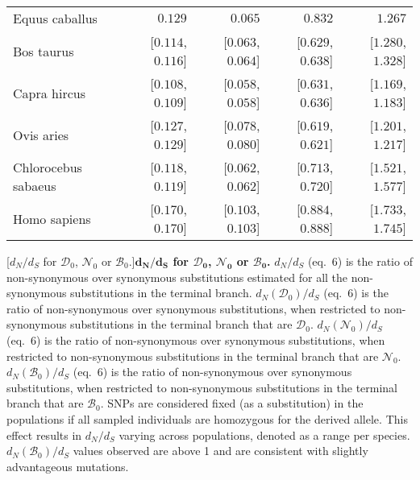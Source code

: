 \documentclass{article}
\newcommand{\dn}{d_N}
\newcommand{\ds}{d_S}
\newcommand{\dnds}{\dn / \ds}
\newcommand{\SphyDel}{\mathcal{D}_0}
\newcommand{\SphyNeu}{\mathcal{N}_0}
\newcommand{\SphyBen}{\mathcal{B}_0}
\begin{document}
\begin{center}
\begin{longtable*}{|l|r|r|r|r|}
            \bottomrule
            \endlastfoot
             Equus caballus & $ 0.129$ & $ 0.065$ & $ 0.832$ & $ 1.267$ \\
            Bos taurus & [$ 0.114$, $ 0.116$] & [$ 0.063$, $ 0.064$] & [$ 0.629$, $ 0.638$] & [$ 1.280$, $ 1.328$] \\
             Capra hircus & [$ 0.108$, $ 0.109$] & [$ 0.058$, $ 0.058$] & [$ 0.631$, $ 0.636$] & [$ 1.169$, $ 1.183$] \\
            Ovis aries & [$ 0.127$, $ 0.129$] & [$ 0.078$, $ 0.080$] & [$ 0.619$, $ 0.621$] & [$ 1.201$, $ 1.217$] \\
             Chlorocebus sabaeus & [$ 0.118$, $ 0.119$] & [$ 0.062$, $ 0.062$] & [$ 0.713$, $ 0.720$] & [$ 1.521$, $ 1.577$] \\
            Homo sapiens & [$ 0.170$, $ 0.170$] & [$ 0.103$, $ 0.103$] & [$ 0.884$, $ 0.888$] & [$ 1.733$, $ 1.745$] \\
        \end{longtable*}
    [$\dnds$ for $\SphyDel$, $\SphyNeu$ or $\SphyBen$.]{\textbf{$\bm{\dnds}$ for $\bm{\SphyDel}$, $\bm{\SphyNeu}$ or $\bm{\SphyBen}$.}
    $\dnds$ (eq.~6) is the ratio of non-synonymous over synonymous substitutions estimated for all the non-synonymous substitutions in the terminal branch.
    $\dn(\SphyDel) / \ds$ (eq.~6) is the ratio of non-synonymous over synonymous substitutions, when restricted to non-synonymous substitutions in the terminal branch that are $\SphyDel$.
    $\dn(\SphyNeu) / \ds$ (eq.~6) is the ratio of non-synonymous over synonymous substitutions, when restricted to non-synonymous substitutions in the terminal branch that are $\SphyNeu$.
    $\dn(\SphyBen) / \ds$ (eq.~6) is the ratio of non-synonymous over synonymous substitutions, when restricted to non-synonymous substitutions in the terminal branch that are $\SphyBen$.
    SNPs are considered fixed (as a substitution) in the populations if all sampled individuals are homozygous for the derived allele.
    This effect results in $\dn / \ds$ varying across populations, denoted as a range per species.
    $\dn(\SphyBen) / \ds$ values observed are above 1 and are consistent with slightly advantageous mutations.\label{table:dnds}}
    \end{center}


    \newpage
\end{document}
